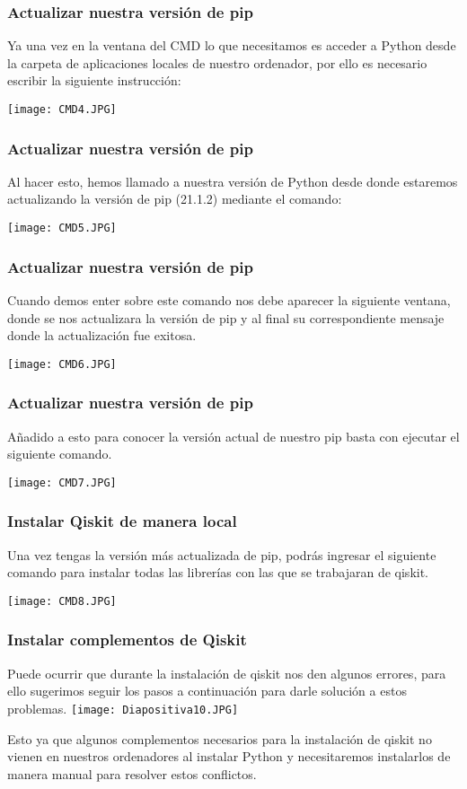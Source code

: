\documentclass[spanish]{beamer}
\begin{document}
    \begin{frame}
    \frametitle{Actualizar nuestra versión de pip}
        Ya una vez en la ventana del CMD lo que necesitamos es acceder a Python desde la carpeta de aplicaciones locales de nuestro ordenador, por ello es necesario escribir la siguiente instrucción:

    \centering\texttt{[image: CMD4.JPG]}
    \end{frame} 

    \begin{frame}
     \frametitle{Actualizar nuestra versión de pip}
       Al hacer esto, hemos llamado a nuestra versión de Python desde donde estaremos actualizando la versión de pip (21.1.2) mediante el comando:
        
    \centering\texttt{[image: CMD5.JPG]}
        
    \end{frame} 

    \begin{frame}
     \frametitle{Actualizar nuestra versión de pip}
        Cuando demos enter sobre este comando nos debe aparecer la siguiente ventana, donde se nos actualizara la versión de pip y al final su correspondiente mensaje donde la actualización fue exitosa.
        
    \centering\texttt{[image: CMD6.JPG]}
    \end{frame} 

    \begin{frame}
     \frametitle{Actualizar nuestra versión de pip}
        Añadido a esto para conocer la versión actual de nuestro pip basta con ejecutar el siguiente comando.
        
    \centering\texttt{[image: CMD7.JPG]}
    \end{frame} 

    

    \begin{frame}
    \frametitle{Instalar Qiskit de manera local}       
        Una vez tengas la versión más actualizada de pip, podrás ingresar el siguiente comando para instalar todas las librerías con las que se trabajaran de qiskit.
        
    \centering\texttt{[image: CMD8.JPG]}
    \end{frame} 

    

    \begin{frame}
    \frametitle{Instalar complementos de Qiskit}
     Puede ocurrir que durante la instalación de qiskit nos den algunos errores, para ello sugerimos seguir los pasos a continuación para darle solución a estos problemas.
     \centering\texttt{[image: Diapositiva10.JPG]}
    
     Esto ya que algunos complementos necesarios para la instalación de qiskit no vienen en nuestros ordenadores al instalar Python y necesitaremos instalarlos de manera manual para resolver estos conflictos.
   \end{frame} 
\end{document}
